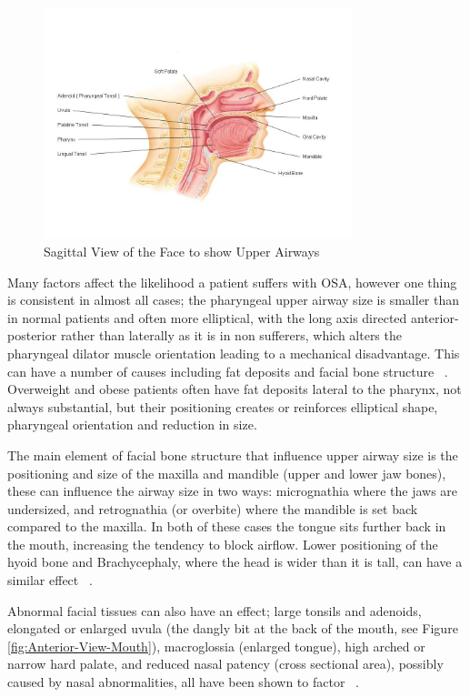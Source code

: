 \begin{figure}[h]
\centering
\includegraphics[width=0.8\textwidth]{drawings/Sagittal-Face}
\caption{Sagittal View of the Face to show Upper Airways ~\cite{sagittalface}}
\label{fig:Sagittal-Face}
\end{figure}
Many factors affect the likelihood a patient suffers with OSA, however one thing is consistent in almost all cases; the pharyngeal upper airway size is smaller than in normal patients and often more elliptical, with the long axis directed anterior-posterior rather than laterally as it is in non sufferers, which alters the pharyngeal dilator muscle orientation leading to a mechanical disadvantage. This can have a number of causes including fat deposits and facial bone structure ~\cite{leiter1996upper}. 
Overweight and obese patients often have fat deposits lateral to the pharynx, not always substantial, but their positioning creates or reinforces elliptical shape, pharyngeal orientation and reduction in size. 

The main element of facial bone structure that influence upper airway size is the positioning and size of the maxilla and mandible (upper and lower jaw bones), these can influence the airway size in two ways: micrognathia where the jaws are undersized, and retrognathia (or overbite) where the mandible is set back compared to the maxilla. In both of these cases the tongue sits further back in the mouth, increasing the tendency to block airflow. Lower positioning of the hyoid bone and Brachycephaly, where the head is wider than it is tall, can have a similar effect ~\cite{lowe1995cephalometric}.

Abnormal facial tissues can also have an effect; large tonsils and adenoids, elongated or enlarged uvula (the dangly bit at the back of the mouth, see Figure \ref{fig:Anterior-View-Mouth}), macroglossia (enlarged tongue), high arched or narrow hard palate, and reduced nasal patency (cross sectional area), possibly caused by nasal abnormalities, all have been shown to factor ~\cite{schwab1995upper}.

